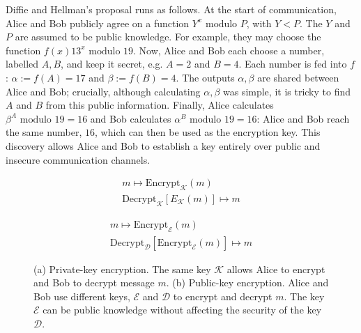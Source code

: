 Diffie and Hellman's proposal runs as follows. At the start of communication, Alice and Bob publicly agree on a function $Y^x \text{ modulo } P$, with $Y < P$. The $Y$ and $P$ are assumed to be public knowledge. For example, they may choose the function $f\left(x\right) 13^x \text{ modulo } 19$. Now, Alice and Bob each choose a number, labelled $A, B$, and keep it secret, e.g. $A = 2$ and $B = 4$. Each number is fed into $f$: $\alpha :=f\left(A\right) = 17$ and $\beta := f\left(B\right) = 4$. The outputs $\alpha, \beta$ are shared between Alice and Bob; crucially, although calculating $\alpha, \beta$ was simple, it is tricky to find $A$ and $B$ from this public information. Finally, Alice calculates $\beta^A \text{ modulo } 19 = 16$ and Bob calculates $\alpha^B \text{ modulo } 19 = 16$: Alice and Bob reach the same number, $16$, which can then be used as the encryption key. This discovery allows Alice and Bob to establish a key entirely over public and insecure communication channels. 



\begin{figure}[htp]
\centering
\captionsetup{width=\linewidth}
\begin{framed}
\begin{subfigure}{0.4\textwidth}
\begin{align*}
m \mapsto \text{Encrypt}_\mathcal{K}\left(m\right) \\
\text{Decrypt}_\mathcal{K}\left[E_\mathcal{K}\left(m\right)\right] \mapsto m
\end{align*}
\caption{}
\end{subfigure}
\begin{subfigure}{0.4\textwidth}
\begin{align*}
m \mapsto \text{Encrypt}_\mathcal{E}\left(m\right) \\
\text{Decrypt}_\mathcal{D}\left[\text{Encrypt}_\mathcal{E}\left(m\right)\right] \mapsto m
\end{align*}
\caption{}
\end{subfigure}
\caption{(a) Private-key encryption. The same key $\mathcal{K}$ allows Alice to encrypt and Bob to decrypt message $m$. (b) Public-key encryption. Alice and Bob use different keys, $\mathcal{E}$ and $\mathcal{D}$ to encrypt and decrypt $m$. The key $\mathcal{E}$ can be public knowledge without affecting the security of the key $\mathcal{D}$.}
\label{fig:pubpriv}
\end{framed}
\end{figure}


